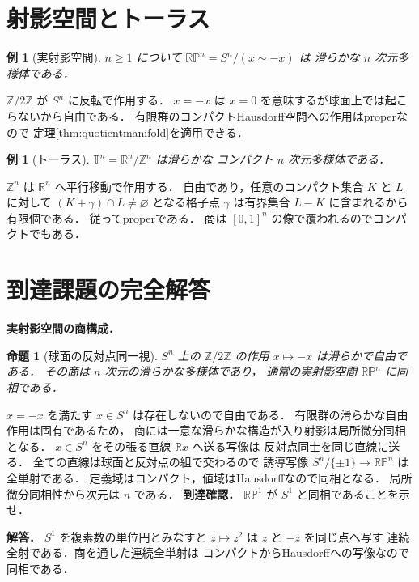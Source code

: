 \documentclass[a5paper,10pt,onecolumn]{jsarticle}
\makeatletter
\theoremstyle{mathnotetheorem}
\newtheorem{proposition}[theorem]{命題}
\newtheorem{example}[theorem]{例}
\renewcommand{\proofname}{証明}
\renewenvironment{proof}[1][\proofname]{%
  \par\pushQED{\qed}\normalfont\topsep4\p@\@plus2\p@\relax
  \trivlist\item[\hskip\labelsep\bfseries #1]\ignorespaces
}{\popQED\endtrivlist\@endpefalse}
\makeatother
\begin{document}
\section{射影空間とトーラス}
\begin{example}[実射影空間]
$n\ge1$ について
$\mathbb{RP}^n=S^n/(x\sim-x)$ は
滑らかな $n$ 次元多様体である．
\end{example}
\begin{proof}
$\mathbb Z/2\mathbb Z$ が $S^n$ に反転で作用する．
$x=-x$ は $x=0$ を意味するが球面上では起こらないから自由である．
有限群のコンパクトHausdorff空間への作用はproperなので
定理\ref{thm:quotientmanifold}を適用できる．
\end{proof}
\begin{example}[トーラス]
$\mathbb T^n=\mathbb R^n/\mathbb Z^n$ は滑らかな
コンパクト $n$ 次元多様体である．
\end{example}
\begin{proof}
$\mathbb Z^n$ は $\mathbb R^n$ へ平行移動で作用する．
自由であり，任意のコンパクト集合 $K$ と $L$ に対して
$(K+\gamma)\cap L\ne\varnothing$ となる格子点 $\gamma$
は有界集合 $L-K$ に含まれるから有限個である．
従ってproperである．
商は $[0,1]^n$ の像で覆われるのでコンパクトでもある．
\end{proof}

\section{到達課題の完全解答}
\noindent\textbf{実射影空間の商構成．}
\begin{proposition}[球面の反対点同一視]
$S^n$ 上の $\mathbb Z/2\mathbb Z$ の作用
$x\mapsto-x$ は滑らかで自由である．
その商は $n$ 次元の滑らかな多様体であり，
通常の実射影空間 $\mathbb{RP}^n$ に同相である．
\end{proposition}
\begin{proof}
$x=-x$ を満たす $x\in S^n$ は存在しないので自由である．
有限群の滑らかな自由作用は固有であるため，
商には一意な滑らかな構造が入り射影は局所微分同相となる．
$x\in S^n$ をその張る直線 $\mathbb Rx$ へ送る写像は
反対点同士を同じ直線に送る．
全ての直線は球面と反対点の組で交わるので
誘導写像 $S^n/\{\pm1\}\to\mathbb{RP}^n$
は全単射である．
定義域はコンパクト，値域はHausdorffなので同相となる．
局所微分同相性から次元は $n$ である．
\end{proof}
\noindent\textbf{到達確認．}
$\mathbb{RP}^1$ が $S^1$ と同相であることを示せ．
\par\noindent\textbf{解答．}
$S^1$ を複素数の単位円とみなすと
$z\mapsto z^2$ は $z$ と $-z$ を同じ点へ写す
連続全射である．商を通した連続全単射は
コンパクトからHausdorffへの写像なので同相である．
\end{document}

